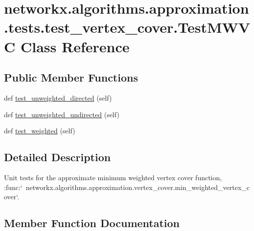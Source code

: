 \hypertarget{classnetworkx_1_1algorithms_1_1approximation_1_1tests_1_1test__vertex__cover_1_1TestMWVC}{}\section{networkx.\+algorithms.\+approximation.\+tests.\+test\+\_\+vertex\+\_\+cover.\+Test\+M\+W\+VC Class Reference}
\label{classnetworkx_1_1algorithms_1_1approximation_1_1tests_1_1test__vertex__cover_1_1TestMWVC}
\subsection*{Public Member Functions}
\begin{DoxyCompactItemize}
\item 
def \hyperlink{classnetworkx_1_1algorithms_1_1approximation_1_1tests_1_1test__vertex__cover_1_1TestMWVC_a649392a92c97c3bab91111cd28ae3a4d}{test\+\_\+unweighted\+\_\+directed} (self)
\item 
def \hyperlink{classnetworkx_1_1algorithms_1_1approximation_1_1tests_1_1test__vertex__cover_1_1TestMWVC_ae36a2a13e340ba30af5bb59f04d7ca09}{test\+\_\+unweighted\+\_\+undirected} (self)
\item 
def \hyperlink{classnetworkx_1_1algorithms_1_1approximation_1_1tests_1_1test__vertex__cover_1_1TestMWVC_a0aca5a03e8b507209e2e607ff2609273}{test\+\_\+weighted} (self)
\end{DoxyCompactItemize}


\subsection{Detailed Description}
\begin{DoxyVerb}Unit tests for the approximate minimum weighted vertex cover
function,
:func:`~networkx.algorithms.approximation.vertex_cover.min_weighted_vertex_cover`.\end{DoxyVerb}
 

\subsection{Member Function Documentation}
\mbox{\label{classnetworkx_1_1algorithms_1_1approximation_1_1tests_1_1test__vertex__cover_1_1TestMWVC_a649392a92c97c3bab91111cd28ae3a4d}} 
